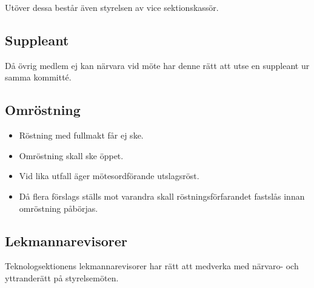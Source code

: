 Utöver dessa består även styrelsen av vice sektionskassör.

\subsection{Suppleant} 

Då övrig medlem ej kan närvara vid möte har denne rätt att utse en suppleant ur samma kommitté. 
\subsection{Omröstning} 

\begin{itemize}
  \item Röstning med fullmakt får ej ske. 
  \item Omröstning skall ske öppet. 
  \item Vid lika utfall äger mötesordförande utslagsröst. 
  \item Då flera förslags ställs mot varandra skall röstningsförfarandet fastslås innan omröstning påbörjas.
\end{itemize}

\subsection{Lekmannarevisorer}
Teknologsektionens lekmannarevisorer har rätt att medverka med närvaro-
och yttranderätt på styrelsemöten.
\newpage

